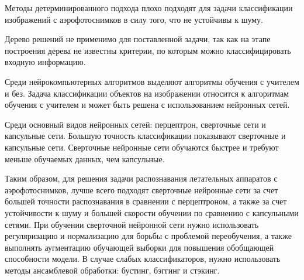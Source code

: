 Методы детерминированного подхода плохо подходят для задачи классификации изображений с аэрофотоснимков в силу того, что не устойчивы к шуму.

Дерево решений не применимо для поставленной задачи, так как на этапе построения дерева не известны критерии, по которым можно классифицировать входную информацию.

Среди нейрокомпьютерных алгоритмов выделяют алгоритмы обучения с учителем и без. Задача классификации объектов на изображении относится к алгоритмам обучения с учителем и может быть решена с использованием нейронных сетей.

Среди основный видов нейронных сетей: перцептрон, сверточные сети и капсульные сети. Большую точность классификации показывают сверточные и капсульные сети. Сверточные нейронные сети обучаются быстрее и требуют меньше обучаемых данных, чем капсульные.

Таким образом, для решения задачи распознавания летательных аппаратов с аэрофотоснимков, лучше всего подходят сверточные нейронные сети за счет большей точности распознавания в сравнении с перцептроном, а также за счет устойчивости к шуму и большей скорости обучении по сравнению с капсульными сетями. При обучении сверточной нейронной сети нужно использовать регуляризацию и нормализацию для борьбы с проблемой переобучения, а также выполнять аугментацию обучающей выборки для повышения обобщающей способности модели. В случае слабых классификаторов, нужно использовать методы ансамблевой обработки: бустинг, бэггинг и стэкинг.
